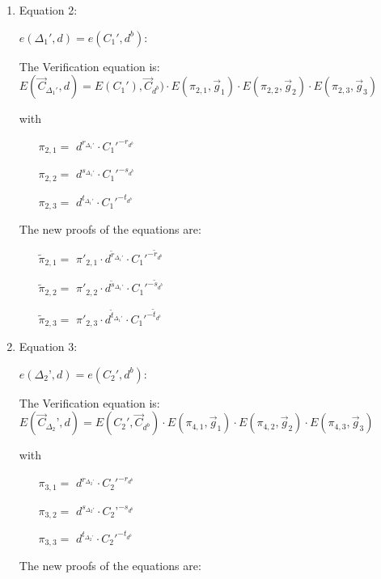 \begin{description}
\begin{enumerate}
  \item Equation 2:

    $e(\boxed{\Delta_1'},d) = e(C_1', \boxed{d^b})$:
    
    The Verification equation is:  $E(\vec{C}_{\Delta_1'}, d) = E(C_1'), \vec{C}_{d^b}) \cdot E(\pi_{2,1}, \vec{g}_1)\cdot E(\pi_{2,2}, \vec{g}_2)\cdot E(\pi_{2,3}, \vec{g}_3)$
    
    with
    \begin{itemize}
    \item[$\pi_{2,1} = $] $d^{r_{\Delta_1'}} \cdot C_1'^{-r_{d^b}}$
    \item[$\pi_{2,2} = $] $d^{s_{\Delta_1'}} \cdot C_1'^{-s_{d^b}}$
    \item[$\pi_{2,3} = $] $d^{t_{\Delta_1'}} \cdot C_1'^{-t_{d^b}}$
    \end{itemize}

    The new proofs of the equations are:
    
    \begin{itemize}
    \item[$\tilde{\pi}_{2,1} = $] $\pi'_{2,1} \cdot d^{\tilde{r}_{\Delta_1'}}\cdot C_1'^{-\tilde{r}_{d^b}}$   
    \item[$\tilde{\pi}_{2,2} = $] $\pi'_{2,2} \cdot d^{\tilde{s}_{\Delta_1'}}\cdot C_1'^{-\tilde{s}_{d^b}}$   
    \item[$\tilde{\pi}_{2,3} = $] $\pi'_{2,3} \cdot d^{\tilde{t}_{\Delta_1'}}\cdot C_1'^{-\tilde{t}_{d^b}}$ 
    \end{itemize}



  \item Equation 3:
    
    $e(\boxed{\Delta_2’},d) = e(C_2', \boxed{d^b})$:
    
    The Verification equation is:  $E(\vec{C}_{\Delta_2}’, d) = E(C_2', \vec{C}_{d^b}) \cdot E(\pi_{4,1}, \vec{g}_1)\cdot E(\pi_{4,2}, \vec{g}_2)\cdot E(\pi_{4,3}, \vec{g}_3)$
    
    with
    \begin{itemize}
    \item[$\pi_{3,1} = $] $d^{r_{\Delta_2’}} \cdot C_2'^{-r_{d^b}}$ 
    \item[$\pi_{3,2} = $] $d^{s_{\Delta_2'}} \cdot C_2’^{-s_{d^b}}$ 
    \item[$\pi_{3,3} = $] $d^{t_{\Delta_2’}} \cdot C_2'^{-t_{d^b}}$ 
    \end{itemize}
    
    The new proofs of the equations are:
    

\end{enumerate}
\end{description}
